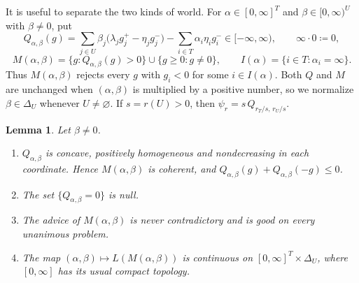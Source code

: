 \documentclass[11pt]{article}
\newtheorem{lemma}[theorem]{Lemma}
\theoremstyle{remark}\newtheorem{remark}[theorem]{Remark}
\begin{document}
It is useful to separate the two kinds of world. For
$\alpha\in[0,\infty]^T$ and $\beta\in[0,\infty)^U$ with $\beta\ne0$, put
\[
 Q_{\alpha,\beta}(g)=\sum_{j\in U}\beta_j\bigl(\lambda_jg_j^+-\eta_jg_j^-\bigr)
 -\sum_{i\in T}\alpha_i\eta_ig_i^-\in[-\infty,\infty),
 \qquad \infty\cdot0\coloneqq0,
\]
\[
 M(\alpha,\beta)=\{g:Q_{\alpha,\beta}(g)>0\}\cup\{g\ge0:g\ne0\},
 \qquad I(\alpha)=\{i\in T:\alpha_i=\infty\}.
\]
Thus $M(\alpha,\beta)$ rejects every $g$ with $g_i<0$ for some
$i\in I(\alpha)$. Both $Q$ and $M$ are unchanged when $(\alpha,\beta)$ is
multiplied by a positive number, so we normalize $\beta\in\Delta_U$
whenever $U\ne\varnothing$. If $s=r(U)>0$, then
$\psi_r=s\,Q_{r_T/s,\,r_U/s}$.

\begin{lemma}\label{lem:Q}
Let $\beta\ne0$.
\begin{enumerate}[label=(\alph*),leftmargin=*]
\item $Q_{\alpha,\beta}$ is concave, positively homogeneous and
nondecreasing in each coordinate. Hence $M(\alpha,\beta)$ is coherent, and
$Q_{\alpha,\beta}(g)+Q_{\alpha,\beta}(-g)\le0$.
\item The set $\{Q_{\alpha,\beta}=0\}$ is null.
\item The advice of $M(\alpha,\beta)$ is never contradictory and is good on
every unanimous problem.
\item The map $(\alpha,\beta)\mapsto L(M(\alpha,\beta))$ is continuous on
$[0,\infty]^T\times\Delta_U$, where $[0,\infty]$ has its usual compact
topology.
\end{enumerate}
\end{lemma}
\end{document}
